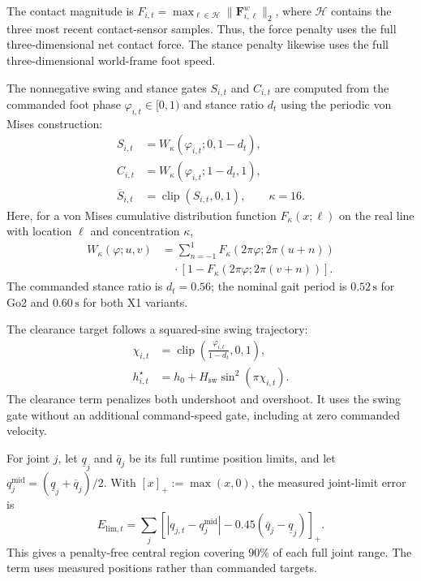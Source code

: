 The contact magnitude is $F_{i,t}=\max_{\ell\in\mathcal H}\|\mathbf F^w_{i,\ell}\|_2$, where $\mathcal H$ contains the three most recent contact-sensor samples. Thus, the force penalty uses the full three-dimensional net contact force. The stance penalty likewise uses the full three-dimensional world-frame foot speed.

The nonnegative swing and stance gates $S_{i,t}$ and $C_{i,t}$ are computed from the commanded foot phase $\varphi_{i,t}\in[0,1)$ and stance ratio $d_t$ using the periodic von Mises construction:
\begin{equation}
\begin{aligned}
    S_{i,t} &= W_\kappa(\varphi_{i,t};0,1-d_t),\\
    C_{i,t} &= W_\kappa(\varphi_{i,t};1-d_t,1),\\
    \overline S_{i,t} &= \operatorname{clip}(S_{i,t},0,1),
    \qquad \kappa=16.
\end{aligned}
\end{equation}
Here, for a von Mises cumulative distribution function $F_\kappa(x;\ell)$ on the real line with location $\ell$ and concentration $\kappa$,
\begin{equation}
\begin{aligned}
    W_\kappa(\varphi;u,v)
    &=\sum_{n=-1}^{1}
    F_\kappa(2\pi\varphi;2\pi(u+n))\\
    &\quad\cdot\left[1-F_\kappa(2\pi\varphi;2\pi(v+n))\right].
\end{aligned}
\end{equation}
The commanded stance ratio is $d_t=0.56$; the nominal gait period is $0.52\,\mathrm{s}$ for Go2 and $0.60\,\mathrm{s}$ for both X1 variants.

The clearance target follows a squared-sine swing trajectory:
\begin{equation}
\begin{aligned}
    \chi_{i,t} &= \operatorname{clip}\!\left(\frac{\varphi_{i,t}}{1-d_t},0,1\right),\\
    h^\star_{i,t} &= h_0+H_{\mathrm{sw}}\sin^2(\pi\chi_{i,t}).
\end{aligned}
\end{equation}
The clearance term penalizes both undershoot and overshoot. It uses the swing gate without an additional command-speed gate, including at zero commanded velocity.

For joint $j$, let $\underline q_j$ and $\overline q_j$ be its full runtime position limits, and let $q_j^{\mathrm{mid}}=(\underline q_j+\overline q_j)/2$. With $[x]_+:=\max(x,0)$, the measured joint-limit error is
\begin{equation}
    E_{\mathrm{lim},t}
    =\sum_j\left[
    |q_{j,t}-q_j^{\mathrm{mid}}|
    -0.45(\overline q_j-\underline q_j)
    \right]_+.
\end{equation}
This gives a penalty-free central region covering $90\%$ of each full joint range. The term uses measured positions rather than commanded targets.

